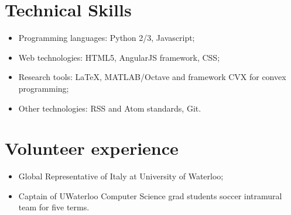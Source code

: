 \documentclass[]{article}
\begin{document}
\section{Technical Skills}\label{technical-skills}

\begin{itemize}
\itemsep1pt\parskip0pt
\item
  Programming languages: Python 2/3, Javascript;
\item
  Web technologies: HTML5, AngularJS framework, CSS;
\item
  Research tools: LaTeX, MATLAB/Octave and framework CVX for convex
  programming;
\item
  Other technologies: RSS and Atom standards, Git.
\end{itemize}

\section{Volunteer experience}\label{volunteer-experience}

\begin{itemize}
\itemsep1pt\parskip0pt
\item
  Global Representative of Italy at University of Waterloo;
\item
  Captain of UWaterloo Computer Science grad students soccer intramural
  team for five terms.
\end{itemize}
\end{document}
